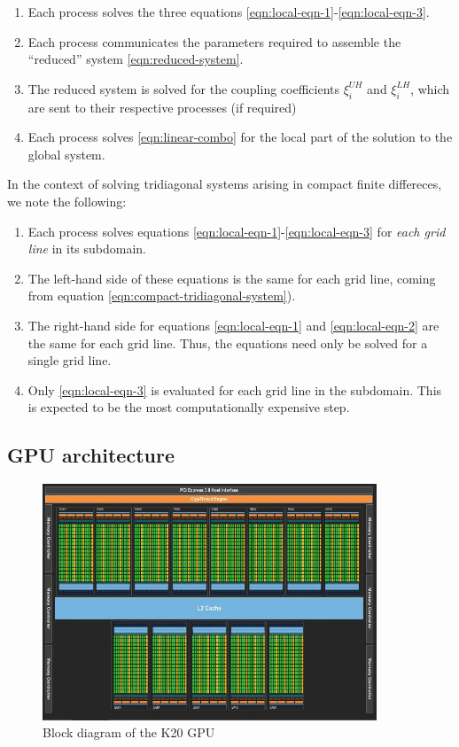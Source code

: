 \documentclass{article}
\begin{document}
    \begin{enumerate}
        \item Each process solves the three equations
        \ref{eqn:local-eqn-1}-\ref{eqn:local-eqn-3}.
        \item Each process communicates the parameters required to
        assemble the ``reduced'' system \ref{eqn:reduced-system}.
        \item The reduced system is solved for the coupling coefficients
        $\xi_i^{UH}$ and $\xi_i^{LH}$, which are sent to their respective processes
        (if required)
        \item Each process solves \ref{eqn:linear-combo} for the local part
        of the solution to the global system.
    \end{enumerate}

    In the context of solving tridiagonal systems arising in compact finite differeces,
    we note the following:

    \begin{enumerate}
        \item Each process solves equations \ref{eqn:local-eqn-1}-\ref{eqn:local-eqn-3}
            for \emph{each grid line} in its subdomain.
        \item The left-hand side of these equations is the same
            for each grid line, coming from equation \ref{eqn:compact-tridiagonal-system}).
        \item The right-hand side for equations \ref{eqn:local-eqn-1} and
            \ref{eqn:local-eqn-2} are the same for each grid line.
            Thus, the equations need only be solved for a single grid line.
        \item Only \ref{eqn:local-eqn-3} is evaluated for each grid line
            in the subdomain. This is expected to be the most computationally expensive step.
    \end{enumerate}


    \subsection{GPU architecture}

        \begin{figure}[h]
        \begin{center}
        \includegraphics[height=200pt]{img/tesla-block-diagram.jpg}
        \end{center}
        \caption{Block diagram of the K20 GPU}
        \label{fig:k20}
        \end{figure}
\end{document}

